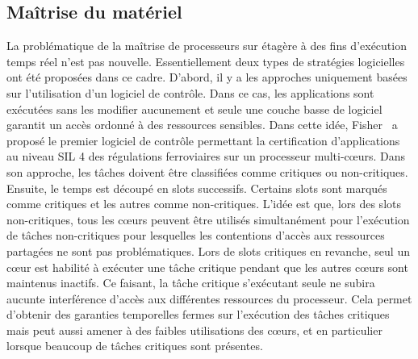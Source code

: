 \documentclass[main.tex]{subfiles}
\begin{document}
\subsection{Maîtrise du matériel}
La problématique de la maîtrise de processeurs sur étagère à des fins d'exécution temps réel n'est pas nouvelle. Essentiellement deux types de stratégies logicielles ont été proposées dans ce cadre. D'abord, il y a les approches uniquement basées sur l'utilisation d'un logiciel de contrôle. Dans ce cas, les applications sont exécutées sans les modifier aucunement et seule une couche basse de logiciel garantit un accès ordonné à des ressources sensibles. Dans cette idée, Fisher~\cite{FisherWP} a proposé le premier logiciel de contrôle permettant la certification d'applications au niveau SIL 4 des régulations ferroviaires sur un processeur multi-c\oe{}urs. Dans son approche, les tâches doivent être classifiées comme critiques ou non-critiques. Ensuite, le temps est découpé en slots successifs. Certains slots sont marqués comme critiques et les autres comme non-critiques. L'idée est que, lors des slots non-critiques, tous les c\oe{}urs peuvent être utilisés simultanément pour l'exécution de tâches non-critiques pour lesquelles les contentions d'accès aux ressources partagées ne sont pas problématiques. Lors de slots critiques en revanche, seul un c\oe{}ur est habilité à exécuter une tâche critique pendant que les autres c\oe{}urs sont maintenus inactifs. Ce faisant, la tâche critique s'exécutant seule ne subira aucunte interférence d'accès aux différentes ressources du processeur. Cela permet d'obtenir des garanties temporelles fermes sur l'exécution des tâches critiques mais peut aussi amener à des faibles utilisations des c\oe{}urs, et en particulier lorsque beaucoup de tâches critiques sont présentes.
\end{document}
